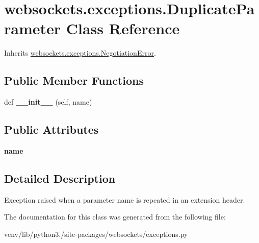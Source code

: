 \hypertarget{classwebsockets_1_1exceptions_1_1_duplicate_parameter}{}\section{websockets.\+exceptions.\+Duplicate\+Parameter Class Reference}
\label{classwebsockets_1_1exceptions_1_1_duplicate_parameter}


Inherits \hyperlink{classwebsockets_1_1exceptions_1_1_negotiation_error}{websockets.\+exceptions.\+Negotiation\+Error}.

\subsection*{Public Member Functions}
\begin{DoxyCompactItemize}
\item 
\mbox{\label{classwebsockets_1_1exceptions_1_1_duplicate_parameter_ae43c0a3ce6e6d851574fdc0c664867e7}} 
def {\bfseries \+\_\+\+\_\+init\+\_\+\+\_\+} (self, name)
\end{DoxyCompactItemize}
\subsection*{Public Attributes}
\begin{DoxyCompactItemize}
\item 
\mbox{\label{classwebsockets_1_1exceptions_1_1_duplicate_parameter_a303f992c22dbfc77f15d618a730dc276}} 
{\bfseries name}
\end{DoxyCompactItemize}


\subsection{Detailed Description}
\begin{DoxyVerb}Exception raised when a parameter name is repeated in an extension header.\end{DoxyVerb}
 

The documentation for this class was generated from the following file\+:\begin{DoxyCompactItemize}
\item 
venv/lib/python3./site-\/packages/websockets/exceptions.\+py\end{DoxyCompactItemize}
